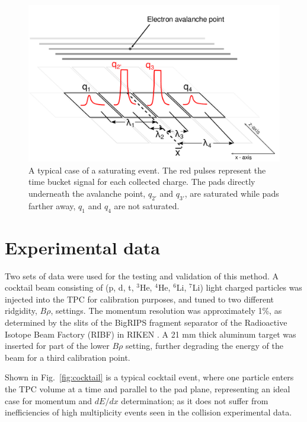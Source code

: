 \documentclass[review]{elsarticle}
\begin{document}
\begin{figure}[ht!]
\includegraphics[width=\linewidth]{saturated_pads}
\caption{A typical case of a saturating event. The red pulses represent the time bucket signal for each collected charge. The pads directly underneath the avalanche point, $q_{2'}$ and $q_{3'}$, are saturated while pads farther away, $q_1$ and $q_4$ are not saturated.}
\label{fig:satpad}
\end{figure}

\section{Experimental data}
Two sets of data were used for the testing and validation of this method. A cocktail beam consisting of (p, d, t, ${}^3$He, ${}^4$He, ${}^6$Li, ${}^7$Li) light charged particles was injected into the TPC for calibration purposes, and tuned to two different ridgidity, $B\rho$, settings. The momentum resolution was approximately 1\%, as determined by the slits of the BigRIPS fragment separator of the Radioactive Isotope Beam Factory (RIBF) in RIKEN \cite{bigrips}. A 21 mm thick aluminum target was inserted for part of the lower $B\rho$ setting, further degrading the energy of the beam for a third calibration point. 

Shown in Fig.~\ref{fig:cocktail} is a typical cocktail event, where one particle enters the TPC volume at a time and parallel to the pad plane, representing an ideal case for momentum and $dE/dx$ determination; as it does not suffer from inefficiencies of high multiplicity events seen in the collision experimental data.  
\end{document}

